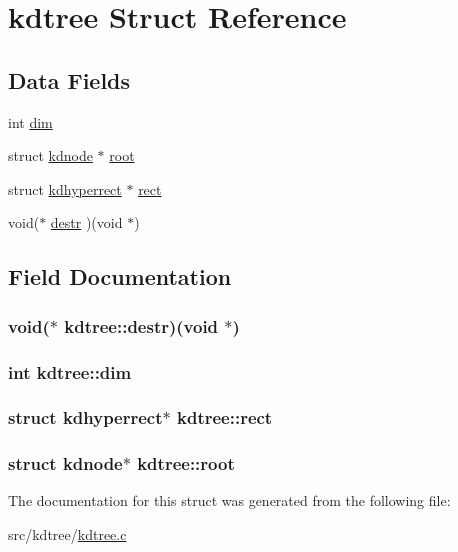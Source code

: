 \hypertarget{structkdtree}{\section{kdtree Struct Reference}
\label{structkdtree}
}
\subsection*{Data Fields}
\begin{DoxyCompactItemize}
\item 
int \hyperlink{structkdtree_a50a985e0d8433bdc599078663b618a83}{dim}
\item 
struct \hyperlink{structkdnode}{kdnode} $\ast$ \hyperlink{structkdtree_accef3227abac75a5eed239590ce574d9}{root}
\item 
struct \hyperlink{structkdhyperrect}{kdhyperrect} $\ast$ \hyperlink{structkdtree_aad2df600bbe8cf682fe61ac6847f5e18}{rect}
\item 
void($\ast$ \hyperlink{structkdtree_af3b2c55cc7a2e7d7e0f7924a3061014b}{destr} )(void $\ast$)
\end{DoxyCompactItemize}


\subsection{Field Documentation}
\hypertarget{structkdtree_af3b2c55cc7a2e7d7e0f7924a3061014b}{
\subsubsection[{destr}]{\setlength{\rightskip}{0pt plus 5cm}void($\ast$ kdtree\+::destr)(void $\ast$)}}\label{structkdtree_af3b2c55cc7a2e7d7e0f7924a3061014b}
\hypertarget{structkdtree_a50a985e0d8433bdc599078663b618a83}{
\subsubsection[{dim}]{\setlength{\rightskip}{0pt plus 5cm}int kdtree\+::dim}}\label{structkdtree_a50a985e0d8433bdc599078663b618a83}
\hypertarget{structkdtree_aad2df600bbe8cf682fe61ac6847f5e18}{
\subsubsection[{rect}]{\setlength{\rightskip}{0pt plus 5cm}struct {\bf kdhyperrect}$\ast$ kdtree\+::rect}}\label{structkdtree_aad2df600bbe8cf682fe61ac6847f5e18}
\hypertarget{structkdtree_accef3227abac75a5eed239590ce574d9}{
\subsubsection[{root}]{\setlength{\rightskip}{0pt plus 5cm}struct {\bf kdnode}$\ast$ kdtree\+::root}}\label{structkdtree_accef3227abac75a5eed239590ce574d9}


The documentation for this struct was generated from the following file\+:\begin{DoxyCompactItemize}
\item 
src/kdtree/\hyperlink{kdtree_8c}{kdtree.\+c}\end{DoxyCompactItemize}
